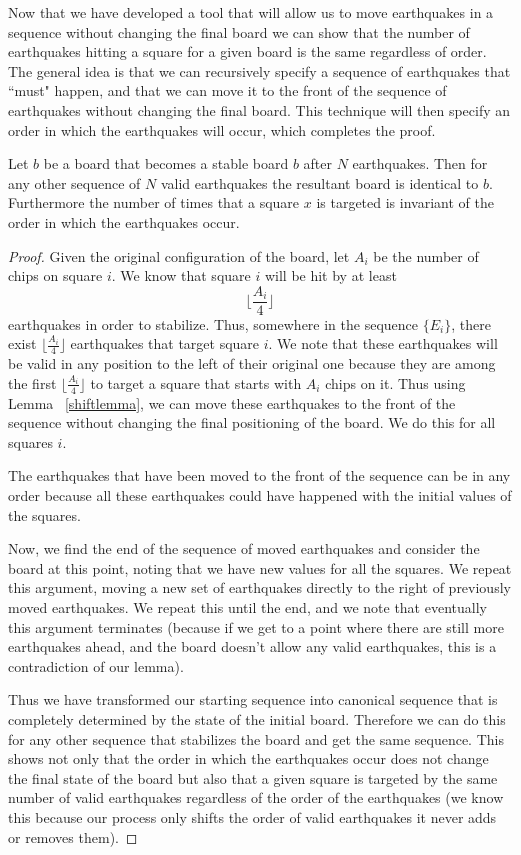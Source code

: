 \documentclass[runningheads,a4paper]{llncs}
\begin{document}
Now that we have developed a tool that will allow us to move earthquakes in a sequence without changing the final board we can show that the number of earthquakes hitting a square for a given board is the same regardless of order. 
The general idea is that we can recursively specify a sequence of earthquakes that ``must" happen, and that we can move it to the front of the sequence of earthquakes without changing the final board. This technique will then specify an order in which the earthquakes will occur, which completes the proof.

\begin{theorem}
\label{thm:order}
Let $b$ be a board that becomes a stable board $b$ after $N$ earthquakes. Then for any other sequence of $N$ valid earthquakes the resultant board is identical to $b$. Furthermore the number of times that a square $x$ is targeted is invariant of the order in which the earthquakes occur. 
\end{theorem}
\begin{proof}
Given the original configuration of the board, let $A_i$ be the number of chips on square $i$. We know that square $i$ will be hit by at least 
\begin{equation*}
\lfloor \frac{A_i}{4} \rfloor
\end{equation*}
earthquakes in order to stabilize. Thus, somewhere in the sequence $\{E_i\}$, there exist $\lfloor \frac{A_i}{4} \rfloor$ earthquakes that target  square $i$. We note that these earthquakes will be valid in any position to the left of their original one because they are among the first $\lfloor \frac{A_i}{4} \rfloor$ to target a square that starts with $A_i$ chips on it. Thus using Lemma ~\ref{shiftlemma}, we can move these earthquakes to the front of the sequence without changing the final positioning of the board. We do this for all squares $i$. 

The earthquakes that have been moved to the front of the sequence can be in any order because all these earthquakes could have happened with the initial values of the squares. 

Now, we find the end of the sequence of moved earthquakes and consider the board at this point, noting that we have new values for all the squares. We repeat this argument, moving a new set of earthquakes directly to the right of previously moved earthquakes. We repeat this until the end, and we note that eventually this argument terminates (because if we get to a point where there are still more earthquakes ahead, and the board doesn't allow any valid earthquakes, this is a contradiction of our lemma).

Thus we have transformed our starting sequence into canonical sequence that is completely determined by the state of the initial board. Therefore we can do this for any other sequence that stabilizes the board and get the same sequence. This shows not only that the order in which the earthquakes occur does not change the final state of the board but also that a given square is targeted by the same number of valid earthquakes regardless of the order of the earthquakes (we know this because our process only shifts the order of valid earthquakes it never adds or removes them). 
\end{proof}
\end{document}

